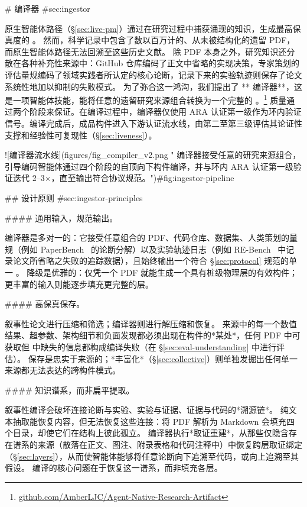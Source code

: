 \begin{markdown}
# \ara{} 编译器 {#sec:ingestor}

原生智能体路径（\S\ref{sec:live-pm}）通过在研究过程中捕获涌现的知识，生成最高保真度的 \ara{}。
然而，科学记录中包含了数以百万计的、从未被结构化的遗留 PDF，而原生智能体路径无法回溯至这些历史文献。
除 PDF 本身之外，研究知识还分散在各种补充性来源中：GitHub 仓库编码了正文中省略的实现决策，专家策划的评估量规编码了领域实践者所认定的核心论断，记录下来的实验轨迹则保存了论文系统性地加以抑制的失败模式。
为了弥合这一鸿沟，我们提出了 **\ara{} 编译器**，这是一项智能体技能，能将任意的遗留研究来源组合转换为一个完整的 \ara{}。\footnote{\url{github.com/AmberLJC/Agent-Native-Research-Artifact}}
质量通过两个阶段来保证。在编译过程中，编译器仅使用 ARA 认证第一级作为环内验证信号。编译完成后，成品构件进入下游认证流水线，由第二至第三级评估其论证性支撑和经验性可复现性（\S\ref{sec:liveness}）。

![编译器流水线](figures/fig_compiler_v2.png "\ara{} 编译器接受任意的研究来源组合，引导编码智能体通过四个阶段的自顶向下构件编译，并与环内 ARA 认证第一级验证迭代 2--3$\times$，直至输出符合协议规范。"){#fig:ingestor-pipeline}

## 设计原则 {#sec:ingestor-principles}

#### 通用输入，规范输出。

编译器是多对一的：它接受任意组合的 PDF、代码仓库、数据集、人类策划的量规（例如 PaperBench~\citep{starace2025paperbench} 的论断分解）以及实验轨迹日志（例如 RE-Bench~\citep{wijk2025rebench} 中记录论文所省略之失败的追踪数据），且始终输出一个符合 \S\ref{sec:protocol} 规范的单一 \ara{}。
降级是优雅的：仅凭一个 PDF 就能生成一个具有桩级物理层的有效构件；更丰富的输入则能逐步填充更完整的层。

#### 高保真保存。

叙事性论文进行压缩和筛选；编译器则进行解压缩和恢复。
来源中的每一个数值结果、超参数、架构细节和负面发现都必须出现在构件的*某处*，任何 PDF 中可获取但 \ara{} 中缺失的信息都构成编译失败（在 \S\ref{sec:eval-understanding} 中进行评估）。
保存是忠实于来源的；*丰富化*（\S\ref{sec:collective}）则单独发掘出任何单一来源都无法表达的跨构件模式。

#### 知识谱系，而非扁平提取。

叙事性编译会破坏连接论断与实验、实验与证据、证据与代码的*溯源链*。
纯文本抽取能恢复内容，但无法恢复这些连接：将 PDF 解析为 Markdown 会填充四个目录，却使它们在结构上彼此孤立。
编译器执行*取证重建*，从那些仅隐含存在谱系的来源（散落在正文、图注、附录表格和代码注释中）中恢复跨层取证绑定（\S\ref{sec:layers}），从而使智能体能够将任意论断向下追溯至代码，或向上追溯至其假设。
编译的核心问题在于恢复这一谱系，而非填充各层。


\end{markdown}

